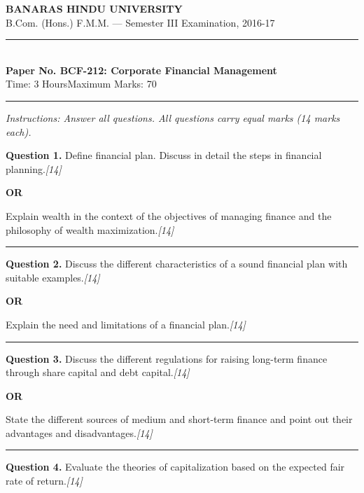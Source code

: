 \documentclass[11pt,a4paper]{article}
\newcommand{\pts}[1]{\hfill   \textit{[#1]}}
\begin{document}
\begin{center}
  {\large\bfseries BANARAS HINDU UNIVERSITY}\\[2pt]
  {\normalsize B.Com. (Hons.) F.M.M. --- Semester III Examination, 2016-17}\\[6pt]
  \rule{0.8\linewidth}{0.5pt}\\[6pt]
  {\large\bfseries Paper No. BCF-212: Corporate Financial Management}\\[4pt]
  {\normalsize Time: 3 Hours\hfill Maximum Marks: 70}
\end{center}

\rule{\linewidth}{0.4pt}

\smallskip



\noindent   \textit{Instructions: Answer all questions. All questions carry equal marks (14 marks each).}

\bigskip




\noindent   \textbf{Question 1.}
Define financial plan. Discuss in detail the steps in financial planning.\pts{14}

\centerline{   \textbf{OR}}

Explain wealth in the context of the objectives of managing finance and the philosophy of wealth maximization.\pts{14}

\medskip\rule{\linewidth}{0.2pt}




\noindent   \textbf{Question 2.}
Discuss the different characteristics of a sound financial plan with suitable examples.\pts{14}

\centerline{   \textbf{OR}}

Explain the need and limitations of a financial plan.\pts{14}

\medskip\rule{\linewidth}{0.2pt}




\noindent   \textbf{Question 3.}
Discuss the different regulations for raising long-term finance through share capital and debt capital.\pts{14}

\centerline{   \textbf{OR}}

State the different sources of medium and short-term finance and point out their advantages and disadvantages.\pts{14}

\medskip\rule{\linewidth}{0.2pt}




\noindent   \textbf{Question 4.}
Evaluate the theories of capitalization based on the expected fair rate of return.\pts{14}
\end{document}

